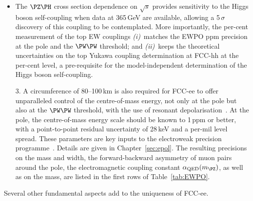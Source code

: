 \begin{tcolorbox}[colback=blue!5!white,
                  colframe=blue!75!black,
                  title=Rationale for the operation model 
                 ]
\begin{itemize}
For example, matching the precision of the SM predictions from the EWPO measurements to the 180\,keV (resp.\ 4\,keV) statistical uncertainty on the \PW mass (resp.\ \PZ width) requires a 20\,MeV (resp.\ 15\,MeV) knowledge of $m_\text{top}$.  
It is only when the mass of the top quark mass is measured with this precision that the FCC-ee EWPO measurements give their best sensitivity, typically increasing the reach in new physics energy scale by 60\%. 
\item 
The $\PZ\PH$ cross section dependence on $\sqrt{s}$ provides sensitivity to the Higgs boson self-coupling when data at 365\,GeV are available, allowing a 5\,$\sigma$ discovery of this coupling to be contemplated. 
More importantly, the per-cent measurement of the top EW couplings 
{\it(i)}~matches the EWPO ppm precision at the \PZ pole and the $\PW\PW$ threshold; 
and {\it (ii)}~keeps the theoretical uncertainties on the top Yukawa coupling determination 
at FCC-hh at the per-cent level, a pre-requisite for the model-independent determination of the Higgs boson self-coupling.
\end{itemize}
\end{tcolorbox}

\begin{itemize}
\item[3.] A circumference of 80--100\,km is also required for FCC-ee to offer unparalleled control of the centre-of-mass energy, not only at the \PZ pole but also at the $\PW\PW$ threshold, with the use of resonant depolarisation~\cite{Blondel:2019jmp,Blondel:2021zix}. 
At the \PZ pole, the centre-of-mass energy scale should be known to 1\,ppm or better, 
with a point-to-point residual uncertainty of 28\,keV and a per-mil level spread. 
These parameters are key inputs to the electroweak precision programme~\cite{Maestre:2021zvq}. 
Details are given in Chapter~\ref{sec:epol}. 
The resulting precisions on the \PZ mass and width, the forward-backward asymmetry of muon pairs around the \PZ pole, the electromagnetic coupling constant $\alpha_\text{QED}(m_{\PZ})$, as well as on the \PW mass, are listed in the first rows of Table~\ref{tab:EWPO}.  
\end{itemize}

\noindent Several other fundamental aspects add to the uniqueness of FCC-ee.

